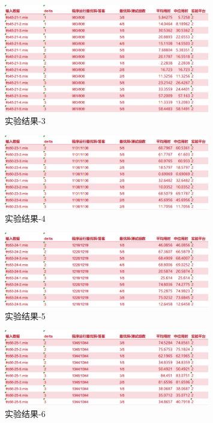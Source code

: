 \documentclass[9pt,dvipsnames,table,UTF8,aspectratio=169]{beamer}
\begin{document}
\begin{frame}
	\begin{figure}[H]
		\centering
		\includegraphics[width=0.8\textwidth]{3.png}
		\caption{实验结果-3}\label{results}
	\end{figure}
\end{frame}

\begin{frame}
	\begin{figure}[H]
		\centering
		\includegraphics[width=0.8\textwidth]{4.png}
		\caption{实验结果-4}\label{results}
	\end{figure}
\end{frame}

\begin{frame}
	\begin{figure}[H]
		\centering
		\includegraphics[width=0.8\textwidth]{5.png}
		\caption{实验结果-5}\label{results}
	\end{figure}
\end{frame}

\begin{frame}
	\begin{figure}[H]
		\centering
		\includegraphics[width=0.8\textwidth]{6.png}
		\caption{实验结果-6}\label{results}
	\end{figure}
\end{frame}
\end{document}
